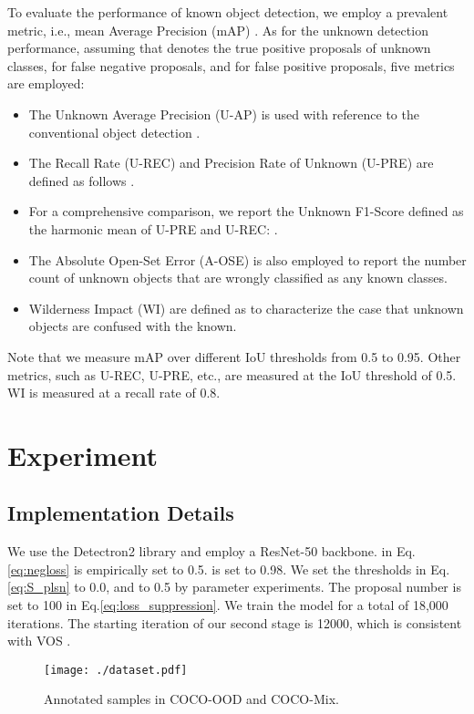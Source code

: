 \documentclass[10pt,twocolumn,letterpaper]{article}
\newcommand{\xf}[1]{{\color{black} #1}}
\begin{document}
To evaluate the performance of known object detection,
we employ a prevalent metric,
i.e., mean Average Precision (mAP) \cite{vos}.
As for the unknown detection performance,
assuming that  denotes the true positive proposals of unknown classes,
 for false negative proposals,
and  for false positive proposals,
five metrics are employed:
\begin{itemize}
    \item The Unknown Average Precision (U-AP) is used with reference to the conventional object detection \cite{voc}.
    \item The Recall Rate (U-REC) and Precision Rate of Unknown (U-PRE) are defined \xf{as follows} .
    \item For a comprehensive comparison,
    we report the Unknown F1-Score defined as the harmonic mean of U-PRE and U-REC: .
    \item The Absolute Open-Set Error (A-OSE) \cite{miller2018dropout} is also employed to report the number count of unknown objects that are wrongly classiﬁed as any known classes.
    \item Wilderness Impact (WI) \cite{dhamija2020overlooked} are defined as  to characterize the case that unknown objects are confused with the known.
\end{itemize}

\xf{Note} that we measure mAP over different IoU thresholds from 0.5 to 0.95.
Other metrics, such as U-REC, U-PRE, etc., are measured at the IoU threshold of 0.5. WI is measured at a recall rate of 0.8.


\section{Experiment}
\subsection{Implementation Details}
\label{sec:imp}
We use the Detectron2 \cite{wu2019detectron2} library and employ a ResNet-50 \cite{he2016deep} backbone.
 in Eq. \ref{eq:negloss} is empirically set to 0.5.
 is set to 0.98.
We set the thresholds  in Eq. \ref{eq:S_plsn} to 0.0,
and  to 0.5 by parameter experiments.
The proposal number  is set to 100 in Eq.\ref{eq:loss_suppression}.
We train the model for a total of 18,000 iterations.
The starting iteration of our second stage is 12000,
which is consistent with VOS \cite{vos}.

\begin{figure}[t!]
\texttt{[image: ./dataset.pdf]}
\caption{Annotated samples in COCO-OOD and COCO-Mix.}
\vspace{-8pt}
\label{fig:dataset}
\end{figure}
\end{document}
